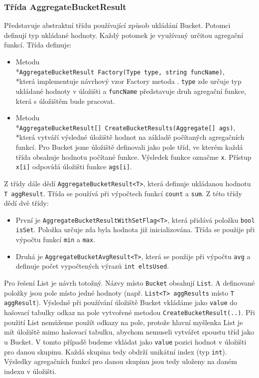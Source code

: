 \subsubsection{Třída AggregateBucketResult}

Představuje abstraktní třídu používající způsob ukládání Bucket.
Potomci definují typ ukládané hodnoty.
Každý potomek je využívaný určitou agregační funkcí.
Třída definuje:
\begin{itemize}
\item Metodu \\*\texttt{AggregateBucketResult Factory(Type type, string funcName)}, \\*která implementuje návrhový vzor Factory metoda \citep[str. 107]{patterns}.
\texttt{type} zde určuje typ ukládané hodnoty v úložišti a \texttt{funcName} představuje druh agregační funkce, která s úložištěm bude pracovat.
\item Metodu \\*\texttt{AggregateBucketResult[] CreateBucketResults(Aggregate[] ags)}, \\*která vytváří výsledné úložiště hodnot na základě počítaných agregačních funkcí.
Pro Bucket jsme úložiště definovali jako pole tříd, ve kterém každá třída obsahuje hodnotu počítané funkce.
Výsledek funkce označme \texttt{x}. 
Přístup \texttt{x[i]} odpovídá úložišti funkce \texttt{ags[i]}.
\end{itemize}
Z třídy dále dědí \texttt{AggregateBucketResult<T>}, která definuje ukládanou hodnotu \texttt{T aggResult}.
Třída se používá při výpočtech funkcí \texttt{count} a \texttt{sum}.
Z této třídy dědí dvě třídy:
\begin{itemize}
\item První je \texttt{AggregateBucketResultWithSetFlag<T>}, která přidává položku \texttt{bool isSet}.
Položka určuje zda byla hodnota již inicializována.
Třída se použije při výpočtu funkcí \texttt{min} a \texttt{max}.
\item Druhá je \texttt{AggregateBucketAvgResult<T>}, která se použije při výpočtu \texttt{avg} a definuje počet vypočtených výrazů \texttt{int eltsUsed}.
\end{itemize}

Pro řešení List je návrh totožný.
Názvy místo \texttt{Bucket} obsahují \texttt{List}.
A definované položky jsou pole místo jedné hodnoty (např. \texttt{List<T> aggResults} místo \texttt{T aggResult}).
Výsledně při používání úložiště Bucket vkládáme jako \texttt{value} do hašovací tabulky odkaz na pole vytvořené metodou \texttt{CreateBucketResult(..)}.
Při použití List nemůžeme použít odkazy na pole, protože hlavní myšlenka List je mít úložiště mimo hašovací tabulku, abychom nemuseli vytvářet spoustu tříd jako u Bucket.
V tomto případě budeme vkládat jako \texttt{value} pozici hodnot v úložišti pro danou skupinu.
Každá skupina tedy obdrží unikátní index (typ \texttt{int}).
Výsledky agregačních funkcí pro danou skupinu jsou tedy uloženy na daném indexu v úložišti.

